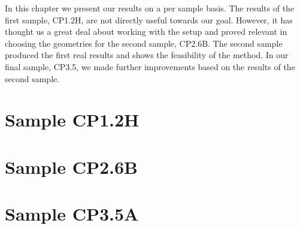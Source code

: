 In this chapter we present our results on a per sample basis. The results of the first sample, CP1.2H, are not directly useful towards our goal. However, it has thought us a great deal about working with the setup and proved relevant in choosing the geometries for the second sample, CP2.6B. The second sample produced the first real results and shows the feasibility of the method. In our final sample, CP3.5, we made further improvements based on the results of the second sample.

\section{Sample CP1.2H}


\newpage
\section{Sample CP2.6B}


\newpage
\section{Sample CP3.5A}
